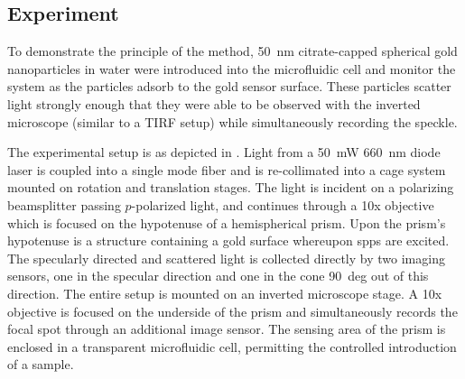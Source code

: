 %
%
%
%
%
%
%


\subsection{Experiment}
To demonstrate the principle of the method, \SI{50}{\nano\meter}
citrate-capped spherical gold nanoparticles in water were introduced into the
microfluidic cell and monitor the system as the particles adsorb to the gold
sensor surface.  These particles scatter light strongly enough that they were
able to be observed with the inverted microscope (similar to a TIRF setup)
while simultaneously recording the speckle.

The experimental setup is as depicted in .  Light from
a \SI{50}{\milli\watt} \SI{660}{\nano\meter} diode laser is coupled into a
single mode fiber and is re-collimated into a cage system mounted on
rotation and translation stages.  The light is incident on a polarizing
beamsplitter passing $p$-polarized light, and continues through a 10x
objective which is focused on the hypotenuse of a hemispherical prism.
Upon the prism's hypotenuse is a structure containing a gold surface
whereupon \glspl{spp} are excited.  The specularly directed and scattered light is
collected directly by two imaging sensors, one in the specular direction
and one in the cone \SI{90}{deg} out of this direction.  The entire setup
is mounted on an inverted microscope stage.  A 10x objective is focused on
the underside of the prism and simultaneously records the focal spot
through an additional image sensor.  The sensing area of the prism is
enclosed in a transparent microfluidic cell, permitting the controlled
introduction of a sample.

